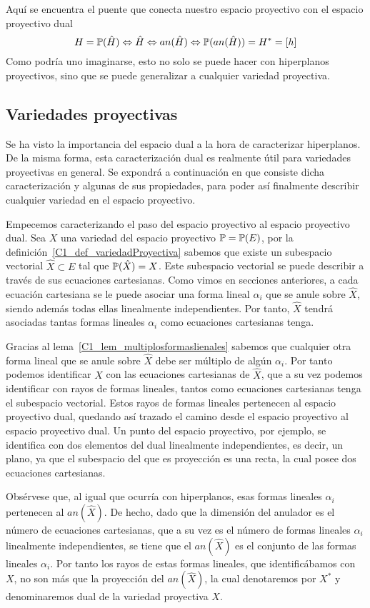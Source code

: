 Aquí se encuentra el puente que conecta nuestro espacio proyectivo con el espacio proyectivo dual
\begin{equation}
	H=\mathbb{P}(\hat{H})\Leftrightarrow \hat{H}\Leftrightarrow an(\hat{H})\Leftrightarrow \mathbb{P}(an(\hat{H}))=H^*=[h]
\end{equation}
Como podría uno imaginarse, esto no solo se puede hacer con hiperplanos proyectivos, sino que se puede generalizar a cualquier variedad proyectiva.
\subsection{Variedades proyectivas}
Se ha visto la importancia del espacio dual a la hora de caracterizar hiperplanos. De la misma forma, esta caracterización dual es realmente útil para variedades proyectivas en general. Se expondrá a continuación en que consiste dicha caracterización y algunas de sus propiedades, para poder así finalmente describir cualquier variedad en el espacio proyectivo.

Empecemos caracterizando el paso del espacio proyectivo al espacio proyectivo dual. Sea $X$ una variedad del espacio proyectivo $\mathbb{P}=\mathbb{P}(E)$, por la definición~\ref{C1_def_variedadProyectiva} sabemos que existe un subespacio vectorial $\hat{X}\subset E$ tal que $\mathbb{P}(\hat{X})=X$. Este subespacio vectorial se puede describir a través de sus ecuaciones cartesianas. Como vimos en secciones anteriores, a cada ecuación cartesiana se le puede asociar una forma lineal $\alpha_i$ que se anule sobre $\hat{X}$, siendo además todas ellas linealmente independientes. Por tanto, $\hat{X}$ tendrá asociadas tantas formas lineales $\alpha_i$ como ecuaciones cartesianas tenga. 

Gracias al lema~\ref{C1_lem_multiplosformaslienales} sabemos que cualquier otra forma lineal que se anule sobre $\hat{X}$ debe ser múltiplo de algún $\alpha_i$. Por tanto podemos identificar $X$ con las ecuaciones cartesianas de $\hat{X}$, que a su vez podemos identificar con rayos de formas lineales, tantos como ecuaciones cartesianas tenga el subespacio vectorial. Estos rayos de formas lineales pertenecen al espacio proyectivo dual, quedando así trazado el camino desde el espacio proyectivo al espacio proyectivo dual. Un punto del espacio proyectivo, por ejemplo, se identifica con dos elementos del dual linealmente independientes, es decir, un plano, ya que el subespacio del que es proyección es una recta, la cual posee dos ecuaciones cartesianas.

Obsérvese que, al igual que ocurría con hiperplanos, esas formas lineales $\alpha_i$ pertenecen al $an(\hat{X})$. De hecho, dado que la dimensión del anulador es el número de ecuaciones cartesianas, que a su vez es el número de formas lineales $\alpha_i$ linealmente independientes, se tiene que el $an(\hat{X})$ es el conjunto de las formas lineales $\alpha_i$. Por tanto los rayos de estas formas lineales, que identificábamos con $X$, no son más que la proyección del $an(\hat{X})$, la cual denotaremos por $X^*$ y denominaremos dual de la variedad proyectiva $X$.

